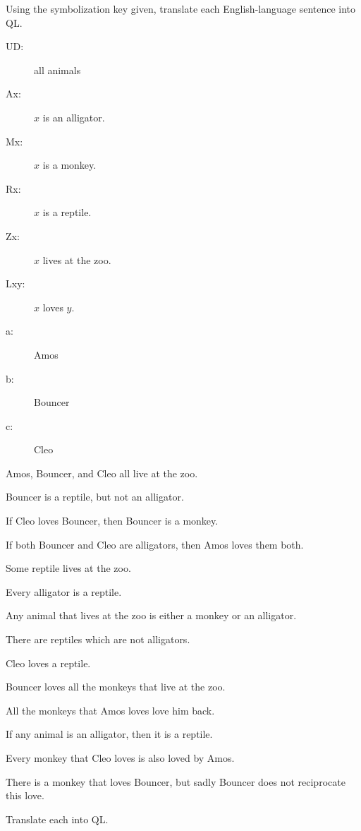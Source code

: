\practiceproblems
\setlength{\parindent}{0em}

\problempart
\label{pr.QLalligators}
Using the symbolization key given, translate each English-language sentence into QL.
\begin{description}
\item[UD:] all animals
\item[Ax:] $x$ is an alligator.
\item[Mx:] $x$ is a monkey.
\item[Rx:] $x$ is a reptile.
\item[Zx:] $x$ lives at the zoo.
\item[Lxy:] $x$ loves $y$.
\item[a:] Amos
\item[b:] Bouncer
\item[c:] Cleo
\end{description}
\begin{kormanize}
\item Amos, Bouncer, and Cleo all live at the zoo. 
\item Bouncer is a reptile, but not an alligator. 
\item If Cleo loves Bouncer, then Bouncer is a monkey. 
\item If both Bouncer and Cleo are alligators, then Amos loves them both.
\item Some reptile lives at the zoo. 
\item Every alligator is a reptile. 
\item Any animal that lives at the zoo is either a monkey or an alligator. 
\item There are reptiles which are not alligators.
\item Cleo loves a reptile.
\item Bouncer loves all the monkeys that live at the zoo.
\item All the monkeys that Amos loves love him back.
\item If any animal is an alligator, then it is a reptile.
\item Every monkey that Cleo loves is also loved by Amos.
\item There is a monkey that loves Bouncer, but sadly Bouncer does not reciprocate this love.
\end{kormanize}


\problempart
\label{pr.BarbaraEtc}
 Translate each into QL. 


